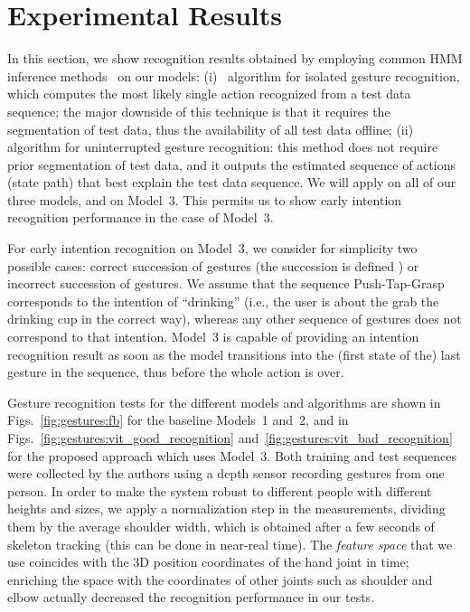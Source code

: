 \section{Experimental Results}
\label{sec:gesture_recognition:results}

In this section, we show recognition results obtained by employing common \ac{HMM} inference methods~\cite{rabiner:1989:hmm} on our models:
(i)~\FB{} algorithm for isolated gesture recognition, which computes the most likely single action recognized from a test data sequence; the major downside of this technique is that it requires the segmentation of test data, thus the availability of all test data offline;
(ii)~\Viterbi{} algorithm for uninterrupted gesture recognition: this method does not require prior segmentation of test data, and it outputs the estimated sequence of actions (state path) that best explain the test data sequence.
We will apply \FB{} on all of our three models, and \Viterbi{} on Model~3.
This permits us to show early intention recognition performance in the case of Model~3.

For early intention recognition on Model~3, we consider for simplicity two possible cases: correct succession of gestures (the succession is defined \apriori) or incorrect succession of gestures.
We assume that the sequence Push-Tap-Grasp corresponds to the intention of ``drinking'' (i.e., the user is about the grab the drinking cup in the correct way), whereas any other sequence of gestures does not correspond to that intention.
Model~3 is capable of providing an intention recognition result as soon as the model transitions into the (first state of the) last gesture in the sequence, thus before the whole action is over. \label{intention_recognition}

Gesture recognition tests for the different models and algorithms are shown in Figs.~\ref{fig:gestures:fb} for the baseline Models~1 and~2, and in Figs.~\ref{fig:gestures:vit_good_recognition} and~\ref{fig:gestures:vit_bad_recognition} for the proposed approach which uses Model~3.
Both training and test sequences were collected by the authors using a depth sensor recording gestures from one person.
In order to make the system robust to different people with different heights and sizes, we apply a normalization step in the measurements, dividing them by the average shoulder width, which is obtained after a few seconds of skeleton tracking (this can be done in near-real time).
The \emph{feature space} that we use coincides with the 3D position coordinates of the hand joint in time; enriching the space with the coordinates of other joints such as shoulder and elbow actually decreased the recognition performance in our tests.

